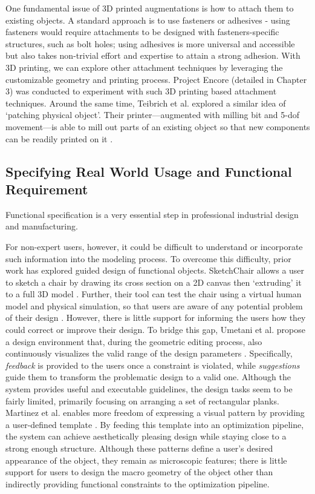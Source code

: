 One fundamental issue of 3D printed augmentations is how to attach them to existing objects. A standard approach is to use fasteners or adhesives - using fasteners would require attachments to be designed with fasteners-specific structures, such as bolt holes; using adhesives is more universal and accessible but also takes non-trivial effort and expertise to attain a strong adhesion. With 3D printing, we can explore other attachment techniques by leveraging the customizable geometry and printing process. Project Encore (detailed in Chapter 3) was conducted to experiment with such 3D printing based attachment techniques. Around the same time, Teibrich et al. explored a similar idea of `patching physical object'. Their printer---augmented with milling bit and 5-dof movement---is able to mill out parts of an existing object so that new components can be readily printed on it \cite{teibrich2015patching}.


\subsection{Specifying Real World Usage and Functional Requirement}
Functional specification is a very essential step in professional industrial design and manufacturing.

For non-expert users, however, it could be difficult to understand or incorporate such information into the modeling process. To overcome this difficulty, prior work has explored guided design of functional objects. SketchChair allows a user to sketch a chair by drawing its cross section on a 2D canvas then `extruding' it to a full 3D model \cite{saul2011sketchchair}. Further, their tool can test the chair using a virtual human model and physical simulation, so that users are aware of any potential problem of their design \cite{saul2011sketchchair}. However, there is little support for informing the users how they could correct or improve their design. To bridge this gap, Umetani et al. propose a design environment that, during the geometric editing process, also continuously visualizes the valid range of the design parameters \cite{umetani2012guided}. Specifically, \textit{feedback} is provided to the users once a constraint is violated, while \textit{suggestions} guide them to transform the problematic design to a valid one. Although the system provides useful and executable guidelines, the design tasks seem to be fairly limited, primarily focusing on arranging a set of rectangular planks. Martinez et al. enables more freedom of expressing a visual pattern by providing a user-defined template \cite{martinez2015structure}. By feeding this template into an optimization pipeline, the system can achieve aesthetically pleasing design while staying close to a strong enough structure. Although these patterns define a user's desired appearance of the object, they remain as microscopic features; there is little support for users to design the macro geometry of the object other than indirectly providing functional constraints to the optimization pipeline.

